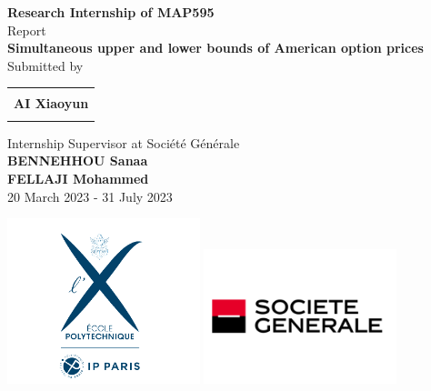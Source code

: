 \begin{titlepage}

\begin{center}

\textup{\LARGE {\bf Research Internship of MAP595} \\ Report}\\[0.5in]

\Huge \textbf {Simultaneous upper and lower bounds of American option prices}\\[1.4in]

\large Submitted by \\
\begin{table}[h]
	\centering
	\begin{tabular}{l}\hline \\
		\LARGE \textbf{AI Xiaoyun} \\ \\ \hline
	\end{tabular}
\end{table}
\Large Internship Supervisor at Société Générale\\[0.1in]
{\textbf{BENNEHHOU Sanaa}\\ \textbf{FELLAJI Mohammed}}\\[0.1in]
\Large 20 March 2023 - 31 July 2023

\vspace{.34in}
	\includegraphics[width=0.42\textwidth]{./X_photo.png}
	\hspace{0.4in}
	\includegraphics[width=0.42\textwidth]{./SG_logo.PNG}
\end{center}
\end{titlepage}
